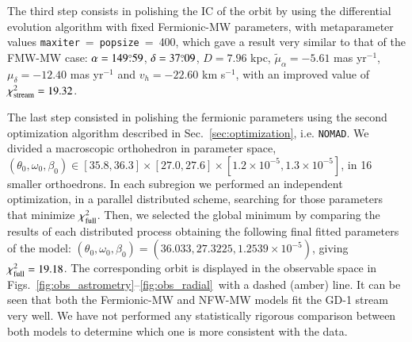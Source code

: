 \documentclass[twocolumn]{aa}
\begin{document}
The third step consists in polishing the IC of the orbit by using the differential evolution algorithm with fixed Fermionic-MW parameters, with metaparameter values \texttt{maxiter}$~=~$\texttt{popsize}$~=~$400, which gave a result very similar to that of the FMW-MW case:
$\alpha=149\overset{\circ}{.} 59$, $\delta=37\overset{\circ}{.} 09$, $D=7.96$ kpc,
$\tilde{\mu}_\alpha=-5.61$ mas yr$^{-1}$, $\mu_\delta=-12.40$ mas yr$^{-1}$ and $v_h=-22.60$ km s$^{-1}$, with an improved value of $\chi^2_{\rm{stream}}= 19.32$.

The last step consisted in polishing the fermionic parameters using the second optimization algorithm described in Sec.~\ref{sec:optimization}, i.e. \texttt{NOMAD}. We divided a  macroscopic orthohedron in parameter space, $(\theta_0, \omega_0, \beta_0) \in [35.8, 36.3]\times[27.0, 27.6]\times [1.2\times10^{-5}, 1.3\times10^{-5}]$, in 16 smaller orthoedrons. In each subregion we performed an independent optimization, in a parallel distributed scheme, searching for those parameters that minimize $\chi^2_{\rm{full}}$. Then, we selected the global minimum by comparing the results of each distributed process obtaining the following final fitted parameters of the model: $(\theta_0, \omega_0, \beta_0)= (36.033, 27.3225, 1.2539\times10^{-5})$, giving $\chi^2_{\rm{full}}= 19.18$.
The corresponding orbit is displayed in the observable space in
Figs.~\ref{fig:obs_astrometry}--\ref{fig:obs_radial}~with a dashed (amber) line. It can be seen that both the Fermionic-MW and NFW-MW models fit the GD-1 stream very well.
We have not performed any statistically rigorous comparison between both models to determine which one is more consistent with the data. 
%
\end{document}
